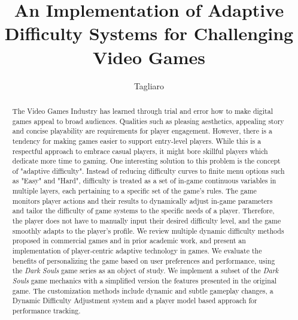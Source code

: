 \documentclass[cic,tc,english]{iiufrgs}
\title{An Implementation of Adaptive Difficulty Systems for Challenging Video Games}
\author{Tagliaro}{Leonardo Ramos Gonzalez}
\begin{document}
\maketitle

\begin{abstract}
    The Video Games Industry has learned through trial and error how to make digital games appeal to broad audiences. Qualities such as pleasing aesthetics, appealing story and concise playability are requirements for player engagement. However, there is a tendency for making games easier to support entry-level players. While this is a respectful approach to embrace casual players, it might bore skillful players which dedicate more time to gaming. One interesting solution to this problem is the concept of "adaptive difficulty". Instead of reducing difficulty curves to finite menu options such as "Easy" and "Hard", difficulty is treated as a set of in-game continuous variables in multiple layers, each pertaining to a specific set of the game's rules. The game monitors player actions and their results to dynamically adjust in-game parameters and tailor the difficulty of game systems to the specific needs of a player. Therefore, the player does not have to manually input their desired difficulty level, and the game smoothly adapts to the player's profile. We review multiple dynamic difficulty methods proposed in commercial games and in prior academic work, and present an implementation of player-centric adaptive technology in games. We evaluate the benefits of personalizing the game based on user preferences and performance, using the \emph{Dark Souls} game series as an object of study. We implement a subset of the \emph{Dark Souls} game mechanics with a simplified version the features presented in the original game. The customization methods include dynamic and subtle gameplay changes, a Dynamic Difficulty Adjustment system and a player model based approach for performance tracking.
\end{abstract}
\end{document}
